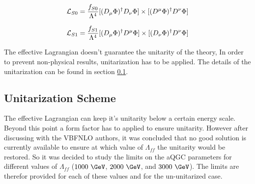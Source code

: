 \begin{equation}
 {\cal{L}}_{S0} = \frac{f_{S0}}{\Lambda^4} [(D_\mu\Phi)^\dagger D_\nu \Phi] \times [(D^\mu\Phi)^\dagger D^\nu \Phi]
  \label{eq:EffLag2}
 \end{equation}

\begin{equation}
 {\cal{L}}_{S1} = \frac{f_{S1}}{\Lambda^4} [(D_\mu\Phi)^\dagger D^\mu \Phi] \times [(D_\nu\Phi)^\dagger D^\nu \Phi]
 \label{eq:EffLag1}
\end{equation}

The effective Lagrangian doesn't guarantee the unitarity of the theory, In order to prevent non-physical results, unitarization has to be applied. The details of the unitarization can be found in section \ref{sec:Unit}.


\subsection{Unitarization Scheme}
\label{sec:Unit}
The effective Lagrangian can keep it's unitarity below a certain energy scale. Beyond this point a form factor has to applied to ensure unitarity. However after discussing with the VBFNLO authors, it was concluded that no good solution is currently available to ensure at which value of $\Lambda_{ff}$ the unitarity would be restored. So it was decided to study the limits on the aQGC parameters for different values of $\Lambda_{ff}$ ($1000~\GeV$, $2000~\GeV$, and $3000~\GeV$). The limits are therefor provided for each of these values and for the un-unitarized case.



